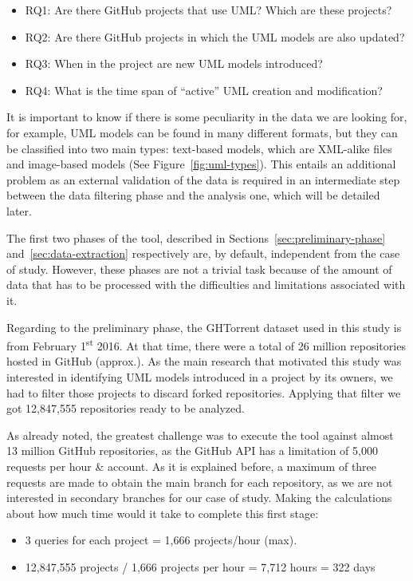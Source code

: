 \documentclass[a4paper, 12pt]{book}
\begin{document}
\begin{itemize}
  \item RQ1: Are there GitHub projects that use UML? Which are these projects?
  \item RQ2: Are there GitHub projects in which the UML models are also updated?
  \item RQ3: When in the project are new UML models introduced?
  \item RQ4: What is the time span of ``active'' UML creation and modification?
\end{itemize}

It is important to know if there is some peculiarity in the data we are looking for, for example, UML models can be
found in many different formats, but they can be classified into two main types: text-based models, which are XML-alike
files and image-based models (See Figure~\ref{fig:uml-types}). This entails an additional problem as an external validation of the data is
required in an intermediate step between the data filtering phase and the analysis one, which will be detailed later.

The first two phases of the tool, described in Sections~\ref{sec:preliminary-phase} and~\ref{sec:data-extraction} respectively
are, by default, independent from the case of study. However, these phases are not a trivial task because of the amount of
data that has to be processed with the difficulties and limitations associated with it.

Regarding to the preliminary phase, the GHTorrent dataset used in this study is from February 1\textsuperscript{st} 2016. At that time, there were
a total of 26 million repositories hosted in GitHub (approx.). As the main research that motivated this study was interested in identifying UML
models introduced in a project by its owners, we had to filter those projects to discard forked repositories. Applying that
filter we got 12,847,555 repositories ready to be analyzed.

As already noted, the greatest challenge was to execute the tool against almost 13 million GitHub repositories, as the GitHub API has a limitation
of 5,000 requests per hour \& account. As it is explained before, a maximum of three requests are made to obtain the main
branch for each repository, as we are not interested in secondary branches for our case of study. Making the calculations about
how much time would it take to complete this first stage:

\begin{itemize}
  \item 3 queries for each project = 1,666 projects/hour (max).
  \item 12,847,555 projects / 1,666 projects per hour = 7,712 hours = 322 days
\end{itemize}
\end{document}
